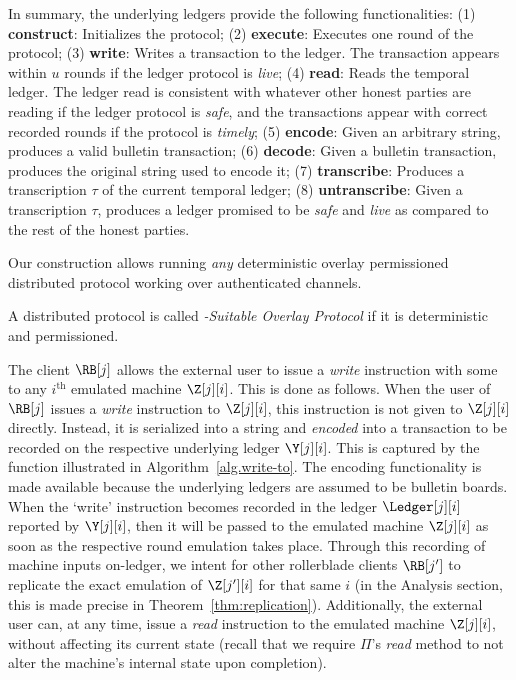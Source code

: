 In summary, the underlying ledgers provide the following functionalities:
(1) \textbf{construct}: Initializes the protocol;
(2) \textbf{execute}: Executes one round of the protocol;
(3) \textbf{write}: Writes a transaction to the ledger. The transaction
appears within $u$ rounds if the ledger protocol is \emph{live};
(4) \textbf{read}: Reads the temporal ledger. The ledger read is
consistent with whatever other honest parties are reading if the
ledger protocol is \emph{safe}, and the transactions appear with
correct recorded rounds if the protocol is \emph{timely};
(5) \textbf{encode}: Given an arbitrary string, produces a valid bulletin transaction;
(6) \textbf{decode}: Given a bulletin transaction, produces the original
string used to encode it;
(7) \textbf{transcribe}: Produces a transcription $\tau$ of the
current temporal ledger;
(8) \textbf{untranscribe}: Given a transcription $\tau$, produces a ledger
promised to be \emph{safe} and \emph{live} as compared to the
rest of the honest parties.


Our construction allows running \emph{any} deterministic
overlay permissioned distributed protocol
working over authenticated channels.

\begin{definition}
  A distributed protocol is called \emph{\rollerblade-Suitable Overlay Protocol}
  if it is deterministic and permissioned.
\end{definition}


The \rollerblade client $\RB[j]$ allows the external user to issue a \emph{write} instruction
with some \data
to any $i^\text{th}$ emulated machine $\Z[j][i]$. This is done as follows. When the user
of $\RB[j]$ issues a \emph{write} instruction to $\Z[j][i]$, this instruction is not given to
$\Z[j][i]$ directly. Instead, it is serialized into a string and \emph{encoded} into a transaction
to be recorded on the respective underlying ledger $\Y[j][i]$. This is captured by
the \writeToMachine function illustrated in Algorithm~\ref{alg.write-to}.
The encoding functionality is made available because
the underlying ledgers are assumed to be bulletin boards.
When the `write' instruction becomes recorded in the ledger $\Ledger[j][i]$ reported
by $\Y[j][i]$, then it will be passed to the emulated
machine $\Z[j][i]$ as soon as the respective round emulation takes place.
Through this recording of machine inputs on-ledger, we intent for other
rollerblade clients $\RB[j']$ to replicate the exact emulation of $\Z[j'][i]$ for that
same $i$ (in the Analysis section, this is made precise in Theorem~\ref{thm:replication}).
Additionally, the external user can, at any time, issue a \emph{read} instruction to
the emulated machine $\Z[j][i]$, without affecting its current state (recall that we
require $\Pi$'s \emph{read} method to not alter the machine's internal state upon completion).

